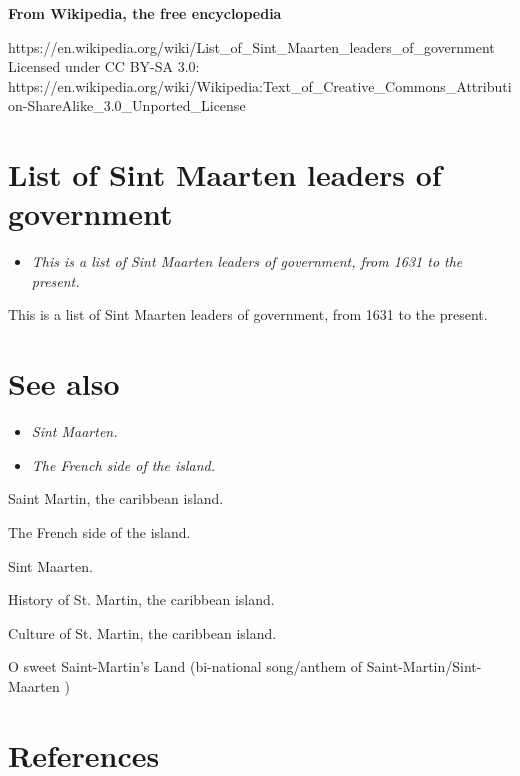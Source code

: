 \textbf{From Wikipedia, the free encyclopedia}

https://en.wikipedia.org/wiki/List\_of\_Sint\_Maarten\_leaders\_of\_government\\
Licensed under CC BY-SA 3.0:\\
https://en.wikipedia.org/wiki/Wikipedia:Text\_of\_Creative\_Commons\_Attribution-ShareAlike\_3.0\_Unported\_License

\section{List of Sint Maarten leaders of
government}\label{list-of-sint-maarten-leaders-of-government}

\begin{itemize}
\item
  \emph{This is a list of Sint Maarten leaders of government, from 1631
  to the present.}
\end{itemize}

This is a list of Sint Maarten leaders of government, from 1631 to the
present.

\section{See also}\label{see-also}

\begin{itemize}
\item
  \emph{Sint Maarten.}
\item
  \emph{The French side of the island.}
\end{itemize}

Saint Martin, the caribbean island.

The French side of the island.

Sint Maarten.

History of St. Martin, the caribbean island.

Culture of St. Martin, the caribbean island.

O sweet Saint-Martin's Land (bi-national song/anthem of
Saint-Martin/Sint-Maarten )

\section{References}\label{references}
